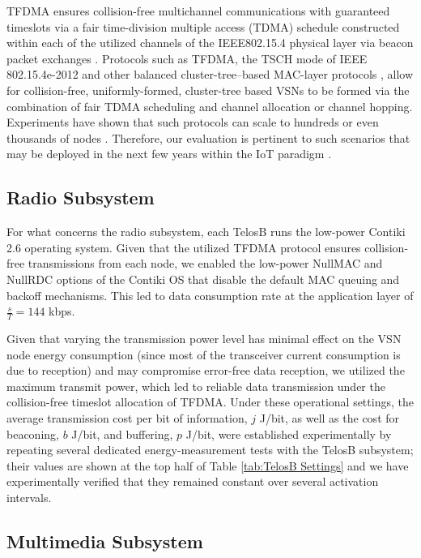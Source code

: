 \documentclass[twocolumn,english]{IEEEtran}
\theoremstyle{plain}
\theoremstyle{definition}
\begin{document}
TFDMA ensures collision-free multichannel communications with guaranteed
timeslots via a fair time-division multiple access (TDMA) schedule
constructed within each of the utilized channels of the IEEE802.15.4
physical layer via beacon packet exchanges \cite{burana2012DTFDMA}.
Protocols such as TFDMA, the TSCH mode of IEEE 802.15.4e-2012 \cite{tinka2010TSCH}
and other balanced cluster-tree--based MAC-layer protocols \cite{AlvesClusterTreeGTS,wang2012IPV6,zuo2012two,koubaa2006gts},
allow for collision-free, uniformly-formed, cluster-tree based VSNs
to be formed via the combination of fair TDMA scheduling and channel
allocation or channel hopping. Experiments have shown that such protocols
can scale to hundreds or even thousands of nodes \cite{pister2008tsmp}.
Therefore, our evaluation is pertinent to such scenarios that may
be deployed in the next few years within the IoT paradigm \cite{zorzi2010IoT,gubbi2013IoT}.


\subsection{Radio Subsystem }

For what concerns the radio subsystem, each TelosB runs the low-power
Contiki 2.6 operating system. Given that the utilized TFDMA protocol
ensures collision-free transmissions from each node, we enabled the
low-power NullMAC and NullRDC options of the Contiki OS that disable
the default MAC queuing and backoff mechanisms. This led to data consumption
rate at the application layer of $\frac{s}{T}=144$ kbps. 

Given that varying the transmission power level has minimal effect
on the VSN node energy consumption (since most of the transceiver
current consumption is due to reception) and may compromise error-free
data reception, we utilized the maximum transmit power, which led
to reliable data transmission under the collision-free timeslot allocation
of TFDMA. Under these operational settings, the average transmission
cost per bit of information, $j$ J/bit, as well as the cost for beaconing,
$b$ J/bit, and buffering, $p$ J/bit, were established experimentally
by repeating several dedicated energy-measurement tests with the TelosB
subsystem; their values are shown at the top half of Table \ref{tab:TelosB Settings}
and we have experimentally verified that they remained constant over
several activation intervals. 


\subsection{Multimedia Subsystem }
\end{document}
